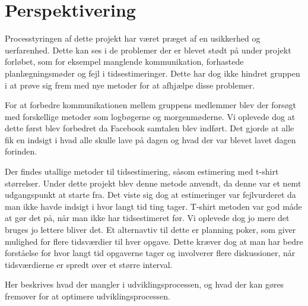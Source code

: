 \chapter{Perspektivering}
Processtyringen af dette projekt har været præget af en usikkerhed og uerfarenhed. Dette kan ses i de problemer der er blevet stødt på under projekt forløbet, som for eksempel manglende kommunikation, forhastede planlægningsmøder og fejl i tidsestimeringer. Dette har dog ikke hindret gruppen i at prøve sig frem med nye metoder for at afhjælpe disse problemer. \newline

For at forbedre kommunikationen mellem gruppens medlemmer blev der forsøgt med forskellige metoder som logbøgerne og morgenmøderne. Vi oplevede dog at dette først blev forbedret da Facebook samtalen blev indført. Det gjorde at alle fik en indsigt i hvad alle skulle lave på dagen og hvad der var blevet lavet dagen forinden. \newline

Der findes utallige metoder til tidsestimering, såsom estimering med t-shirt størrelser. Under dette projekt blev denne metode anvendt, da denne var et nemt udgangspunkt at starte fra. Det viste sig dog at estimeringer var fejlvurderet da man ikke havde indsigt i hvor langt tid ting tager. T-shirt metoden var god måde at gør det på, når man ikke har tidsestimeret før. Vi oplevede dog jo mere det bruges jo lettere bliver det. Et alternavtiv til dette er planning poker, som giver mulighed for flere tidsværdier til hver opgave. Dette kræver dog at man har bedre forståelse for hvor langt tid opgaverne tager og involverer flere diskussioner, når tidsværdierne er spredt over et større interval.



Her beskrives hvad der mangler i udviklingsprocessen, og hvad der kan gøres 
fremover for at optimere udviklingsprocessen. 